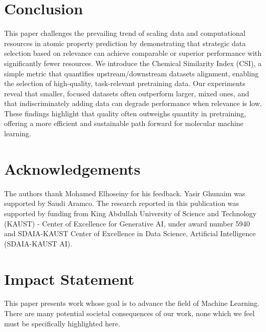 
\section{Conclusion}

This paper challenges the prevailing trend of scaling data and computational resources in atomic property prediction by demonstrating that strategic data selection based on relevance can achieve comparable or superior performance with significantly fewer resources. We introduce the Chemical Similarity Index (CSI), a simple metric that quantifies upstream/downstream datasets alignment, enabling the selection of high-quality, task-relevant pretraining data. Our experiments reveal that smaller, focused datasets often outperform larger, mixed ones, and that indiscriminately adding data can degrade performance when relevance is low. These findings highlight that quality often outweighs quantity in pretraining, offering a more efficient and sustainable path forward for molecular machine learning. 

\section*{Acknowledgements}
The authors thank Mohamed Elhoseiny for his feedback. Yasir Ghunaim was supported by Saudi Aramco. The research reported in this publication was supported by funding from King Abdullah University of Science and Technology (KAUST) - Center of Excellence for Generative AI, under award number 5940 and SDAIA-KAUST Center of Excellence in Data Science, Artificial Intelligence (SDAIA-KAUST AI). 

\section*{Impact Statement}
This paper presents work whose goal is to advance the field of Machine Learning. There are many potential societal consequences of our work, none which we feel must be specifically highlighted here.
